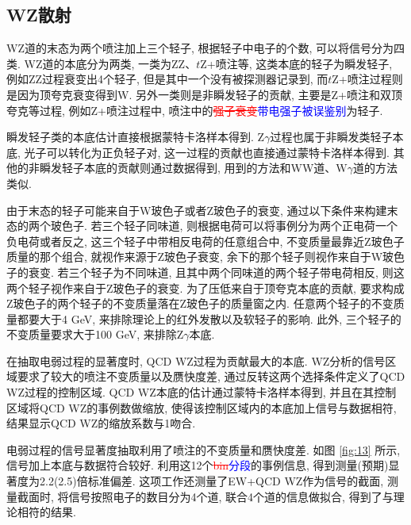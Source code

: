 \documentclass{SCIS2020cn}
\newcommand{\Wboson}{\text{W}}
\newcommand{\Zboson}{\text{Z}}
\newcommand{\add}{\textcolor{blue}}
\newcommand{\rmv}[1]{\textcolor{red}{\sout{#1}}}
\begin{document}
\subsection{WZ散射}

WZ道的末态为两个喷注加上三个轻子, 根据轻子中电子的个数, 可以将信号分为四类. WZ道的本底分为两类, 一类为ZZ、$t$Z+喷注等, 这类本底的轻子为瞬发轻子, 例如ZZ过程衰变出4个轻子, 但是其中一个没有被探测器记录到, 而$t$Z+喷注过程则是因为顶夸克衰变得到W. 另外一类则是非瞬发轻子的贡献, 主要是Z+喷注和双顶夸克等过程, 例如Z+喷注过程中, 喷注中的\rmv{强子衰变}\add{带电强子被误鉴别}为轻子. 

瞬发轻子类的本底估计直接根据蒙特卡洛样本得到. $\Zboson\gamma$过程也属于非瞬发类轻子本底, 光子可以转化为正负轻子对, 这一过程的贡献也直接通过蒙特卡洛样本得到. 其他的非瞬发轻子本底的贡献则通过数据得到, 用到的方法和WW道、$\Wboson\gamma$道的方法类似. 

由于末态的轻子可能来自于W玻色子或者Z玻色子的衰变, 通过以下条件来构建末态的两个玻色子. 若三个轻子同味道, 则根据电荷可以将事例分为两个正电荷一个负电荷或者反之, 这三个轻子中带相反电荷的任意组合中, 不变质量最靠近Z玻色子质量的那个组合, 就视作来源于Z玻色子衰变, 余下的那个轻子则视作来自于W玻色子的衰变. 若三个轻子为不同味道, 且其中两个同味道的两个轻子带电荷相反, 则这两个轻子视作来自于Z玻色子的衰变. 为了压低来自于顶夸克本底的贡献, 要求构成Z玻色子的两个轻子的不变质量落在Z玻色子的质量窗之内. 任意两个轻子的不变质量都要大于4 GeV, 来排除理论上的红外发散以及软轻子的影响. 此外, 三个轻子的不变质量要求大于100 GeV, 来排除$\Zboson\gamma$本底. 

在抽取电弱过程的显著度时, QCD WZ过程为贡献最大的本底. WZ分析的信号区域要求了较大的喷注不变质量以及赝快度差, 通过反转这两个选择条件定义了QCD WZ过程的控制区域. QCD WZ本底的估计通过蒙特卡洛样本得到, 并且在其控制区域将QCD WZ的事例数做缩放, 使得该控制区域内的本底加上信号与数据相符, 结果显示QCD WZ的缩放系数与1吻合. 

电弱过程的信号显著度抽取利用了喷注的不变质量和赝快度差. 如图 \ref{fig:13} 所示, 信号加上本底与数据符合较好. 利用这12个\rmv{bin}\add{分段}的事例信息, 得到测量(预期)显著度为2.2(2.5)倍标准偏差. 这项工作还测量了EW+QCD WZ作为信号的截面, 测量截面时, 将信号按照电子的数目分为4个道, 联合4个道的信息做拟合, 得到了与理论相符的结果. 
\end{document}
